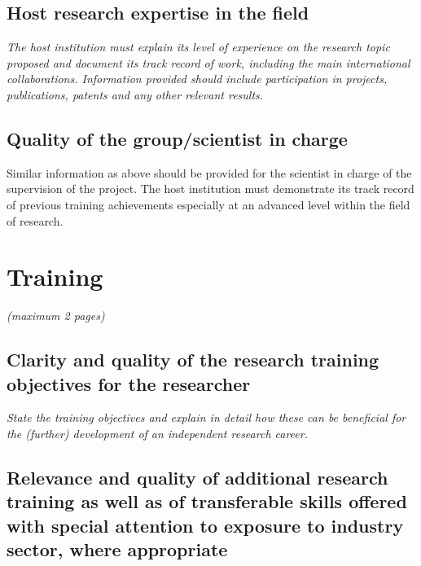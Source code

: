 \documentclass[a4paper,11pt]{article}
\newenvironment{xcomment}{\em}{}
\begin{document}
\begin{bibunit}
\subsection{Host research expertise in the field}

\begin{xcomment}
The host institution must explain its level of experience on the research topic proposed and
document its track record of work, including the main international collaborations. Information
provided should include participation in projects, publications, patents and any other relevant
results. 
\end{xcomment}


\subsection{Quality of the group/scientist in charge}

Similar information as above should be provided for the scientist in charge of the supervision of
the project. The host institution must demonstrate its track record of previous training
achievements especially at an advanced level within the field of research. 

\end{bibunit}

\newpage
\section{Training}

\begin{xcomment}
 (maximum 2 pages)
\end{xcomment}

\subsection{Clarity and quality of the research training objectives for the researcher}

\begin{xcomment}
 State the training objectives and explain in detail how these can be beneficial for the (further)
development of an independent research career.
\end{xcomment}

\subsection{Relevance and quality of additional research training as well as of transferable skills offered with special attention to exposure to industry sector, where appropriate}
\end{document}
